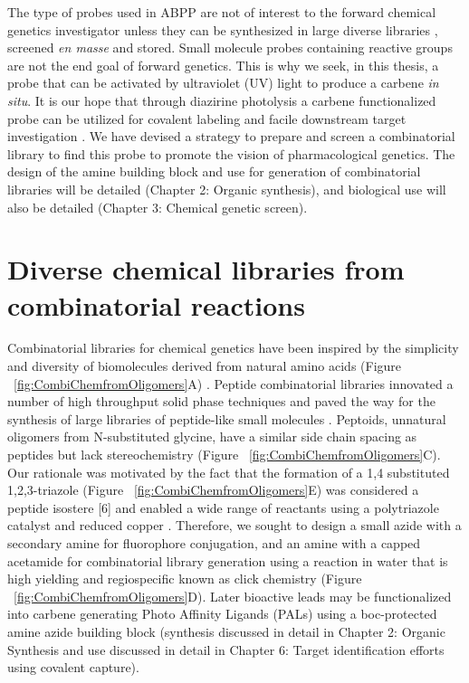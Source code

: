 The type of probes used in ABPP are not of interest to the forward chemical genetics investigator unless they can be synthesized in large diverse libraries \cite{dobson2004chemical}, screened {\it en masse} \cite{schreiber2003small,schreiber1998chemical} and stored. Small molecule probes containing reactive groups are not the end goal of forward genetics. This is why we seek, in this thesis, a probe that can be activated by ultraviolet (UV) light to produce a carbene {\it in situ}. It is our hope that through diazirine photolysis a carbene functionalized probe can be utilized for covalent labeling and facile downstream target investigation \cite{blencowe2005development,bond2009photocrosslinking}. We have devised a strategy to prepare and screen a combinatorial library to find this probe to promote the vision of pharmacological genetics. The design of the amine building block and use for generation of combinatorial libraries will be detailed (Chapter 2: Organic synthesis), and biological use will also be detailed (Chapter 3: Chemical genetic screen).  

\section{Diverse chemical libraries from combinatorial reactions}

Combinatorial libraries for chemical genetics have been inspired by the simplicity and diversity of biomolecules derived from natural amino acids (Figure ~\ref{fig:CombiChemfromOligomers}A) \cite{pirrung2004molecular}. Peptide combinatorial libraries innovated a number of high throughput solid phase techniques and paved the way for the synthesis of large libraries of peptide-like small molecules \cite{simon1992peptoids,dorner1996synthesis}. Peptoids, unnatural oligomers from N-substituted glycine, have a similar side chain spacing as peptides but lack stereochemistry (Figure ~\ref{fig:CombiChemfromOligomers}C)\cite{simon1992peptoids}. Our rationale was motivated by the fact that the formation of a 1,4 substituted 1,2,3-triazole (Figure ~\ref{fig:CombiChemfromOligomers}E) was considered a peptide isostere [6] and enabled a wide range of reactants using a polytriazole catalyst \cite{chan2004polytriazoles} and reduced copper \cite{himo2005copper}. Therefore, we sought to design a small azide with a secondary amine for fluorophore conjugation, and an amine with a capped acetamide for combinatorial library generation using a reaction in water that is high yielding and regiospecific known as click chemistry (Figure ~\ref{fig:CombiChemfromOligomers}D). Later bioactive leads may be functionalized into carbene generating Photo Affinity Ligands (PALs) using a boc-protected amine azide building block (synthesis discussed in detail in Chapter 2: Organic Synthesis and use discussed in detail in Chapter 6: Target identification efforts using covalent capture).


